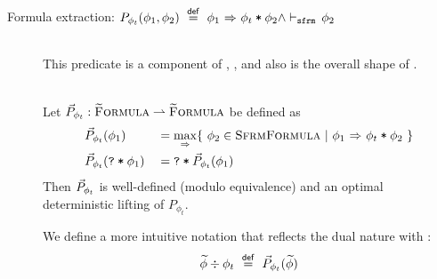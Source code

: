 \begin{description}
    \item[Formula extraction: $P_{\phi_t}(\phi_1, \phi_2) ~\overset{\textup{\textsf{def}}}{=}~ {\phi_1} \,\,{\Rightarrow}\,\, {\textup{\texttt{$\phi_t$\:*\:$\phi_2$}} \wedge \vdash_\texttt{sfrm}\, \phi_2}$]~\\
    This predicate is a component of , ,  and also is the overall shape of .
    \begin{lemma}~\\
        Let $\vec{P}_{\phi_t} : \textup{\textsc{\ensuremath{\widetilde{\text{F}}}ormula}} \rightharpoonup \textup{\textsc{\ensuremath{\widetilde{\text{F}}}ormula}}$ be defined as
        \begin{alignat*}{2}
        & \vec{P}_{\phi_t}(\phi_1)          & &= \underset{{} \,\,{\Rightarrow}\,\, {}}{\max} \{~ \phi_2 \in \textup{\textsc{SfrmFormula}} ~|~ {\phi_1} \,\,{\Rightarrow}\,\, {\textup{\texttt{$\phi_t$\:*\:$\phi_2$}}} ~\} \\
        & \vec{P}_{\phi_t}(\textup{\texttt{\textup{\texttt{?}}\:*\:\ensuremath{\phi_1}}}) & &= \textup{\texttt{\textup{\texttt{?}}\:*\:\ensuremath{\vec{P}_{\phi_t}(\phi_1)}}}
        \end{alignat*}
        Then $\vec{P}_{\phi_t}$ is well-defined (modulo equivalence) and an optimal deterministic lifting of $P_{\phi_t}$.
    \end{lemma}
    We define a more intuitive notation that reflects the dual nature with \ttt{*}:
    \begin{displaymath}
    \widetilde{\phi}\div\phi_t ~\overset{\textup{\textsf{def}}}{=}~ \vec{P}_{\phi_t}(\widetilde{\phi})
    \end{displaymath}
\end{description}